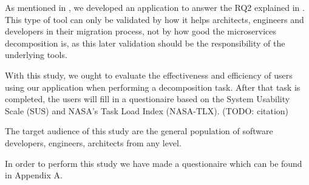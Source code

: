 As mentioned in , we developed an application to answer the RQ2 explained in . This type of tool can only be validated by how it helps architects, engineers and developers in their migration process, not by how good the microservices decomposition is, as this later validation should be the responsibility of the underlying tools.

With this study, we ought to evaluate the effectiveness and efficiency of users using our application when performing a decomposition task. After that task is completed, the users will fill in a questionaire based on the System Usability Scale (SUS) and NASA's Task Load Index (NASA-TLX).
  (TODO: citation)

The target audience of this study are the general population of software developers, engineers, architects from any level.

In order to perform this study we have made a questionaire which can be found in Appendix A.
